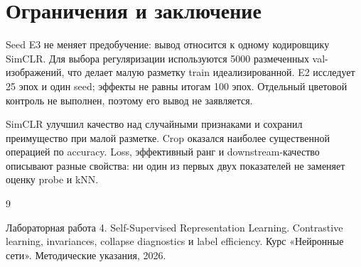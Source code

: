 \section{Ограничения и заключение}
Seed E3 не меняет предобучение: вывод относится к одному кодировщику SimCLR. Для выбора регуляризации используются 5000 размеченных val-изображений, что делает малую разметку train идеализированной. E2 исследует 25 эпох и один seed; эффекты не равны итогам 100 эпох. Отдельный цветовой контроль не выполнен, поэтому его вывод не заявляется.

SimCLR улучшил качество над случайными признаками и сохранил преимущество при малой разметке. Crop оказался наиболее существенной операцией по accuracy. Loss, эффективный ранг и downstream-качество описывают разные свойства: ни один из первых двух показателей не заменяет оценку probe и kNN.
\clearpage
\renewcommand{\refname}{Список использованных источников}
\begin{thebibliography}{9}
 Лабораторная работа 4. Self-Supervised Representation Learning. Contrastive learning, invariances, collapse diagnostics и label efficiency. Курс «Нейронные сети». Методические указания, 2026.
\end{thebibliography}
\clearpage
